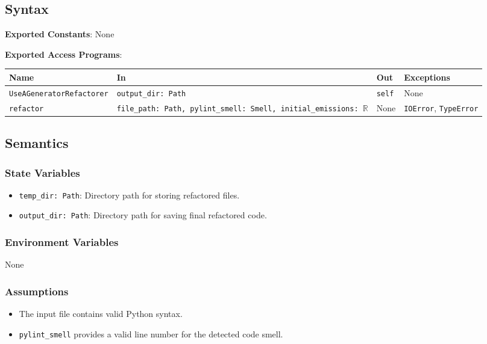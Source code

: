 \documentclass[12pt, titlepage]{article}
\begin{document}
\subsection{Syntax}
\noindent
\textbf{Exported Constants}: None

\noindent
\textbf{Exported Access Programs}:\\
\begin{tabularx}{\linewidth}{|
    l|
    >{\raggedright\arraybackslash}X|
    l|
    l|}
  \hline
  \textbf{Name} & \textbf{In} & \textbf{Out} & \textbf{Exceptions} \\\hline
  \texttt{UseAGeneratorRefactorer} & \texttt{output\_dir: Path} & \texttt{self} & None \\
  \hline
  \texttt{refactor} & \texttt{file\_path: Path, pylint\_smell: Smell, initial\_emissions: $\mathbb{R}$} & None & \texttt{IOError}, \texttt{TypeError} \\
  \hline
\end{tabularx}

\subsection{Semantics}

\subsubsection{State Variables}
\begin{itemize}
  \item \texttt{temp\_dir: Path}: Directory path for storing refactored files.
  \item \texttt{output\_dir: Path}: Directory path for saving final refactored code.
\end{itemize}

\subsubsection{Environment Variables}
None

\subsubsection{Assumptions}
\begin{itemize}
  \item The input file contains valid Python syntax.
  \item \texttt{pylint\_smell} provides a valid line number for the detected code smell.
\end{itemize}
\end{document}
